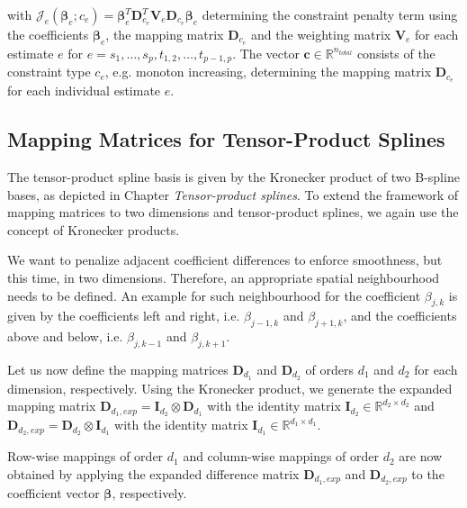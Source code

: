 \documentclass[10pt,a4paper]{article}
\begin{document}
	with $\mathcal J_e(\boldsymbol{\beta}_e; c_e) = \boldsymbol{\beta}_e^T \boldsymbol{D}_{c_e}^T \boldsymbol{V}_e \boldsymbol{D}_{c_e} \boldsymbol{\beta}_e$ determining the constraint penalty term using the coefficients $\boldsymbol{\beta}_e$, the mapping matrix $\boldsymbol{D}_{c_e}$ and the weighting matrix $\boldsymbol{V}_e$ for each estimate $e$ for $e=s_1, \dots, s_p, t_{1,2}, \dots, t_{p-1,p}$. The vector $\boldsymbol{c} \in \mathbb{R}^{n_{total}}$ consists of the constraint type $c_e$, e.g. monoton increasing, determining the mapping matrix $\boldsymbol{D}_{c_e}$ for each individual estimate $e$. 
	

	\subsection{Mapping Matrices for Tensor-Product Splines}
	
	The tensor-product spline basis is given by the Kronecker product of two B-spline bases, as depicted in Chapter \emph{Tensor-product splines}. To extend the framework of mapping matrices to two dimensions and tensor-product splines, we again use the concept of Kronecker products. 
	
	We want to penalize adjacent coefficient differences to enforce smoothness, but this time, in two dimensions. Therefore, an appropriate spatial neighbourhood needs to be defined. An example for such neighbourhood for the coefficient $\beta_{j, k}$ is given by the coefficients left and right, i.e. $\beta_{j-1, k}$ and $\beta_{j+1, k}$, and the coefficients above and below, i.e. $\beta_{j, k-1}$ and $\beta_{j,k+1}$. 
	
	Let us now define the mapping matrices $\boldsymbol{D}_{d_1}$ and $\boldsymbol{D}_{d_2}$ of orders $d_1$ and $d_2$ for each dimension, respectively. Using the Kronecker product, we generate the expanded mapping matrix $\boldsymbol{D}_{d_{1}, exp} = \boldsymbol{I}_{d_2} \otimes \boldsymbol{D}_{d_1}$ with the identity matrix $\boldsymbol{I}_{d_2} \in \mathbb{R}^{d_2 \times d_2}$ and $\boldsymbol{D}_{d_2,exp} = \boldsymbol{D}_{d_2} \otimes \boldsymbol{I}_{d_1}$ with the identity matrix $\boldsymbol{I}_{d_1} \in \mathbb{R}^{d_1 \times d_1}$. 
	
	Row-wise mappings of order $d_1$ and column-wise mappings of order $d_2$ are now obtained by applying the expanded difference matrix $\boldsymbol{D}_{d_1,exp}$ and $\boldsymbol{D}_{d_2,exp}$ to the coefficient vector $\boldsymbol{\beta}$, respectively. 
	
\end{document}
